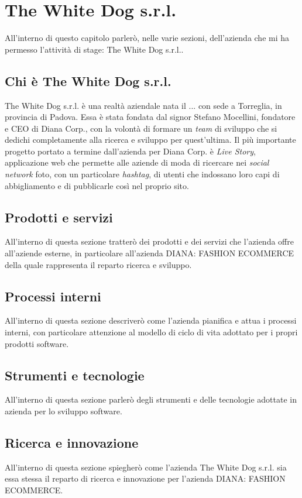 \newpage
\chapter{The White Dog s.r.l.}
\label{cap:thewhitedog}

All'interno di questo capitolo parlerò, nelle varie sezioni, dell'azienda che mi ha permesso l'attività di stage: The White Dog s.r.l..

\section{Chi è The White Dog s.r.l.}

The White Dog s.r.l. è una realtà aziendale nata il ... con sede a Torreglia, in provincia di Padova. Essa è stata fondata dal signor Stefano Mocellini, fondatore e CEO di Diana Corp., con la volontà di formare un \textit{team} di sviluppo che si dedichi completamente alla ricerca e sviluppo per quest'ultima. Il più importante progetto portato a termine dall'azienda per Diana Corp. è \textit{Live Story}, applicazione web che permette alle aziende di moda di ricercare nei \textit{social network} foto, con un particolare \textit{hashtag}, di utenti che indossano loro capi di abbigliamento e di pubblicarle così nel proprio sito. 

\section{Prodotti e servizi}

All'interno di questa sezione tratterò dei prodotti e dei servizi che l'azienda offre all'aziende esterne, in particolare all'azienda DIANA: FASHION ECOMMERCE della quale rappresenta il reparto ricerca e sviluppo.

\section{Processi interni}

All'interno di questa sezione descriverò come l'azienda pianifica e attua i processi interni, con particolare attenzione al modello di ciclo di vita adottato per i propri prodotti software.

\section{Strumenti e tecnologie}

All'interno di questa sezione parlerò degli strumenti e delle tecnologie adottate in azienda per lo sviluppo software.

\section{Ricerca e innovazione}

All'interno di questa sezione spiegherò come l'azienda The White Dog s.r.l. sia essa stessa il reparto di ricerca e innovazione per l'azienda DIANA: FASHION ECOMMERCE.